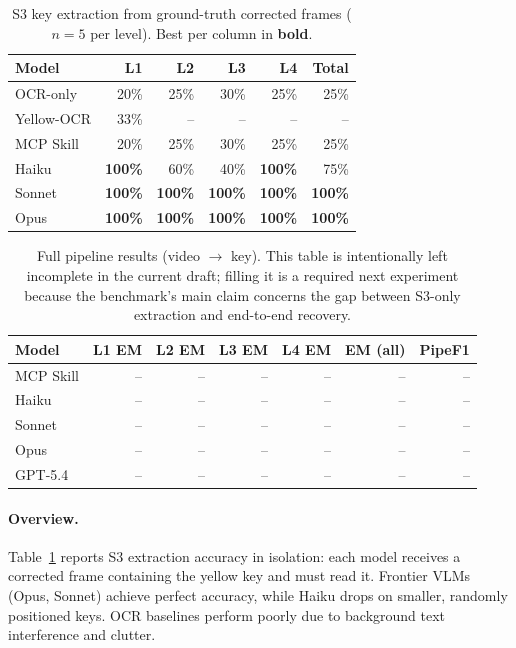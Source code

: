 \begin{table}[h]
\centering\small
\caption{S3 key extraction from ground-truth corrected frames ($n{=}5$ per
level). Best per column in \textbf{bold}.}
\label{tab:s3}
\begin{tabular}{lrrrr|r}
\toprule
Model & L1 & L2 & L3 & L4 & Total \\
\midrule
OCR-only       & 20\% & 25\% & 30\% & 25\% & 25\% \\
Yellow-OCR     & 33\% & --   & --   & --   & --   \\
MCP Skill      & 20\% & 25\% & 30\% & 25\% & 25\% \\
Haiku          & \textbf{100\%} & 60\% & 40\% & \textbf{100\%} & 75\% \\
Sonnet         & \textbf{100\%} & \textbf{100\%} & \textbf{100\%} & \textbf{100\%} & \textbf{100\%} \\
Opus           & \textbf{100\%} & \textbf{100\%} & \textbf{100\%} & \textbf{100\%} & \textbf{100\%} \\
\bottomrule
\end{tabular}
\end{table}

\begin{table}[h]
\centering\small
\caption{Full pipeline results (video $\to$ key). This table is intentionally
left incomplete in the current draft; filling it is a required next experiment
because the benchmark's main claim concerns the gap between S3-only extraction
and end-to-end recovery.}
\label{tab:main}
\begin{tabular}{lrrrrrr}
\toprule
Model & L1 EM & L2 EM & L3 EM & L4 EM & EM (all) & PipeF1 \\
\midrule
MCP Skill     & -- & -- & -- & -- & -- & -- \\
Haiku         & -- & -- & -- & -- & -- & -- \\
Sonnet        & -- & -- & -- & -- & -- & -- \\
Opus          & -- & -- & -- & -- & -- & -- \\
GPT-5.4       & -- & -- & -- & -- & -- & -- \\
\bottomrule
\end{tabular}
\end{table}

\paragraph{Overview.}
Table~\ref{tab:s3} reports S3 extraction accuracy in isolation: each model
receives a corrected frame containing the yellow key and must read it. Frontier
VLMs (Opus, Sonnet) achieve perfect accuracy, while Haiku drops on smaller,
randomly positioned keys. OCR baselines perform poorly due to background text
interference and clutter.

